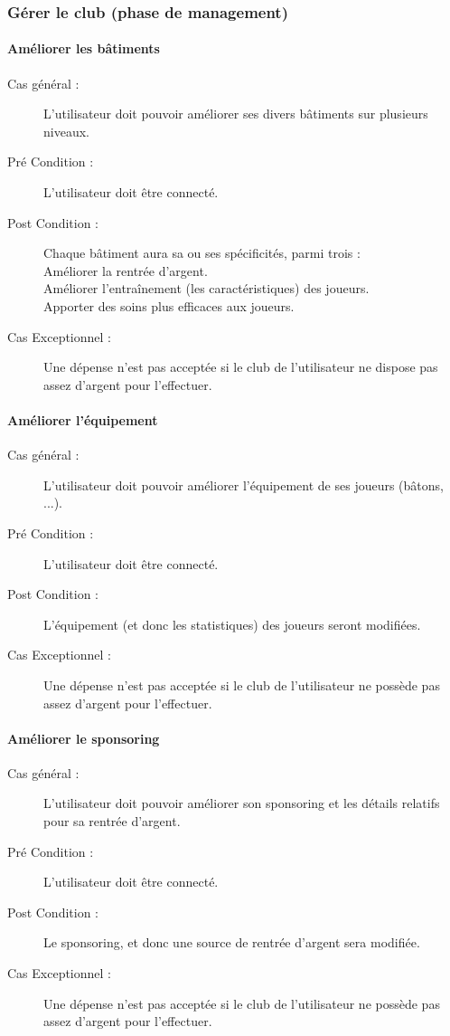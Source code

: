 \documentclass[a4paper]{article}
\begin{document}
\subsubsection{Gérer le \gls{club} (phase de management)}
\paragraph{Améliorer les bâtiments}
\begin{description}
\item[Cas général :] L'\gls{utilisateur} doit pouvoir améliorer ses divers bâtiments sur plusieurs niveaux. 
\item[Pré Condition  :] L'\gls{utilisateur} doit être connecté.
\item[Post Condition :] Chaque bâtiment aura sa ou ses spécificités, parmi trois :\\
Améliorer la rentrée d'argent.\\
Améliorer l'entraînement (les caractéristiques) des joueurs.\\
Apporter des soins plus efficaces aux joueurs.
\item[Cas Exceptionnel :] Une dépense n'est pas acceptée si le \gls{club} de l'\gls{utilisateur} ne dispose pas assez d'argent pour l'effectuer.
\end{description}
\paragraph{Améliorer l'équipement}
\begin{description}
\item[Cas général :] L'\gls{utilisateur} doit pouvoir améliorer l'équipement de ses joueurs (bâtons, ...).
\item[Pré Condition  :] L'\gls{utilisateur} doit être connecté.
\item[Post Condition :] L'équipement (et donc les statistiques) des joueurs seront modifiées.
\item[Cas Exceptionnel :] Une dépense n'est pas acceptée si le \gls{club} de l'\gls{utilisateur} ne possède pas assez d'argent pour l'effectuer.
\end{description}
\paragraph{Améliorer le sponsoring}
\begin{description}
\item[Cas général :] L'\gls{utilisateur} doit pouvoir améliorer son sponsoring et les détails relatifs pour sa rentrée d'argent.
\item[Pré Condition  :] L'\gls{utilisateur} doit être connecté.
\item[Post Condition :] Le sponsoring, et donc une source de rentrée d'argent sera modifiée.
\item[Cas Exceptionnel :] Une dépense n'est pas acceptée si le \gls{club} de l'\gls{utilisateur} ne possède pas assez d'argent pour l'effectuer.
\end{description}
\end{document}
